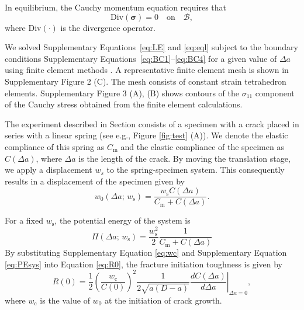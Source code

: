 \documentclass[12pt,onecolumn]{article}
\makeatletter
\DeclareRobustCommand*{\nameref}[1]{%
      \emph{\myorg@nameref{#1}}%
    }%
\makeatother
\begin{document}
\begin{bibunit}
In equilibrium, the Cauchy momentum equation requires that 
%
\begin{equation}
\label{eq:eql}
    \mathrm{Div}(\bm{\sigma}) = 0 \quad \text{on} \quad \mathcal{B},
\end{equation}
%
where $\mathrm{Div}(\cdot)$ is the divergence operator.

We solved Supplementary Equations~\eqref{eq:LE} and \eqref{eq:eql} subject to the boundary conditions Supplementary Equations~\eqref{eq:BC1}--\eqref{eq:BC4} for a given value of $\Delta a$ using finite element methods \cite{hughes2012finite}. A representative finite element mesh is shown in Supplementary Figure 2 (C). The mesh consists of constant strain tetrahedron elements. Supplementary Figure 3 (A), (B) shows contours of the $\sigma_{11}$ component of the Cauchy stress obtained from the finite element calculations.

The experiment described in Section \nameref{sec:res} consists of a specimen with a crack placed in series with a linear spring (see e.g., Figure \ref{fig:test} (A)). We denote the elastic compliance of this spring as $C_\mathrm{m}$ and the elastic compliance of the specimen as $C(\Delta a)$, where $\Delta a$ is the length of the crack.
%
By moving the translation stage, we apply a displacement $w_{s}$ to the spring-specimen system. This consequently results in a displacement of the specimen given by
%
\begin{equation}
\label{eq:wc}
    w_0(\Delta a;\,w_\mathrm{s})=\frac{w_\mathrm{s} C(\Delta a)}{C_\mathrm{m}+C(\Delta a)}.
\end{equation}
%

For a fixed $w_\mathrm{s}$, the potential energy of the system is
%
\begin{equation}
    \label{eq:PEsys}
     \Pi(\Delta a;\,w_\mathrm{s})=\frac{w_\mathrm{s}^2}{2}\frac{1}{C_\mathrm{m}+C(\Delta a)}
 \end{equation}
%
By substituting Supplementary Equation \eqref{eq:wc} and Supplementary Equation \eqref{eq:PEsys} into Equation \eqref{eq:R0}, the fracture initiation toughness is given by
%
\begin{equation}
    \label{eq:Gexp}
    R(0)=\frac{1}{2}\left(\frac{w_\mathrm{c}}{C(0)}\right)^2\frac{1}{2\sqrt{a(D-a)}}\left.\frac{dC(\Delta a)}{d\Delta a}\right\vert_{\Delta a=0},
\end{equation}
%
where $w_\mathrm{c}$ is the value of $w_0$ at the initiation of crack growth.



\end{bibunit}
\end{document}

